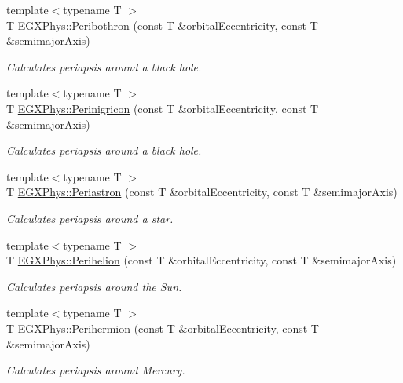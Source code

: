 \begin{DoxyCompactItemize}
{\footnotesize template$<$typename T $>$ }\\T \hyperlink{group___e_g_x_phys-_periapsis_gada5892309279a3a687c4eb2f88238e4e}{E\+G\+X\+Phys\+::\+Peribothron} (const T \&orbital\+Eccentricity, const T \&semimajor\+Axis)
\begin{DoxyCompactList}\small\item\em Calculates periapsis around a black hole. \end{DoxyCompactList}\item 
{\footnotesize template$<$typename T $>$ }\\T \hyperlink{group___e_g_x_phys-_periapsis_ga99d86af90179994e17158b082c502fd4}{E\+G\+X\+Phys\+::\+Perinigricon} (const T \&orbital\+Eccentricity, const T \&semimajor\+Axis)
\begin{DoxyCompactList}\small\item\em Calculates periapsis around a black hole. \end{DoxyCompactList}\item 
{\footnotesize template$<$typename T $>$ }\\T \hyperlink{group___e_g_x_phys-_periapsis_ga477de6824cbb5986cdae923141e21648}{E\+G\+X\+Phys\+::\+Periastron} (const T \&orbital\+Eccentricity, const T \&semimajor\+Axis)
\begin{DoxyCompactList}\small\item\em Calculates periapsis around a star. \end{DoxyCompactList}\item 
{\footnotesize template$<$typename T $>$ }\\T \hyperlink{group___e_g_x_phys-_periapsis_ga941d285e3a0b48ada9c9f60925ff63c2}{E\+G\+X\+Phys\+::\+Perihelion} (const T \&orbital\+Eccentricity, const T \&semimajor\+Axis)
\begin{DoxyCompactList}\small\item\em Calculates periapsis around the Sun. \end{DoxyCompactList}\item 
{\footnotesize template$<$typename T $>$ }\\T \hyperlink{group___e_g_x_phys-_periapsis_ga9562e9cbfd73019ae9cdaa643b843d63}{E\+G\+X\+Phys\+::\+Perihermion} (const T \&orbital\+Eccentricity, const T \&semimajor\+Axis)
\begin{DoxyCompactList}\small\item\em Calculates periapsis around Mercury. \end{DoxyCompactList}\item 

\end{DoxyCompactItemize}
